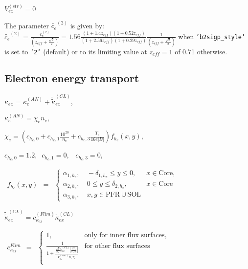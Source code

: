 \documentclass[a4paper,10pt]{report}
\begin{document}
$V_{ex}^{(str)} = 0$

The parameter $\widetilde{c_e}^{(2)}$ is given by:
$\widetilde{c_e}^{(2)} = \frac{c_e^{(2)}}{\left( z_{eff} + \frac{\sqrt{2}}{2} \right)} = 1.56 \frac{(1 + 1.4 z_{eff})(1 + 0.52 z_{eff})}{(1 + 2.56 z_{eff})( 1 + 0.29 z_{eff})}\frac{1}{\left( z_{eff} + \frac{\sqrt{2}}{2} \right)}$
when {\tt 'b2sigp\_style'} is set to {\tt '2'} (default) or to its limiting
value at $z_{eff} = 1$ of 0.71 otherwise.

\subsection{Electron energy transport}

$\kappa_{ex} = \kappa_e^{(AN)} + \widetilde{\widetilde{\kappa}}_{ex}^{(CL)}$,

$\kappa_e^{(AN)} = \chi_e n_e$,

$\chi_e = \left(
	c_{h_e,0} + c_{h_e,1} \frac{10^{20}}{n_e} + c_{h_e,3} \frac{T_e}{16 e|B|}
\right) f_{h_e} (x,y)$,


$c_{h_e,0} = 1.2 , \;\; c_{h_e,1}=0, \;\;\; c_{h_e,3}=0$,

$
\begin{matrix}
f_{h_e}(x,y) & =
& \left\{
\begin{matrix}
\alpha_{1,h_e}, & \ -\delta _{1,h_e} \le y \le 0, & x \in \text{Core}, \\
\alpha_{2,h_e}, & \ 0 \le y \le \delta _{2,h_e}, & x \in \text{Core} \\
\alpha_{3,h_e}, & \ x,y\in \text{PFR} \cup \text{SOL}
\end{matrix} \right.
\end{matrix}
$

$\widetilde{\widetilde{\kappa}}_{ex}^{(CL)} = c_{\kappa_{ex}}^{(Flim)} \widetilde{\kappa}_{ex}^{(CL)}$

$
\begin{matrix}
c_{\kappa_{ex}}^{Flim} & =
& \left\{
\begin{matrix}
1, & \text{only for inner flux surfaces,} \\
\frac 1 {
	1 + \frac{
	\frac{\sqrt g}{h_x} \widetilde{\kappa}_{ex}^{(CL)}
	\left|
		\frac{\partial T_e}{h_x \partial x}
	\right|}
	{ V_{h_e}^{(max)} n_e T_e}
}
&  \text{for other flux surfaces} \\
\end{matrix} \right.
\end{matrix}
$
\end{document}
